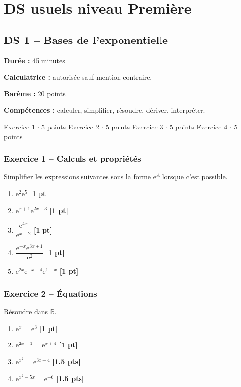 \documentclass[11pt,a4paper]{article}
\newcommand{\R}{\mathbb{R}}
\newcommand{\e}{\mathrm{e}}
\newcommand{\pts}[1]{\hfill \textbf{[#1 pt]}}
\newcommand{\ptss}[1]{\hfill \textbf{[#1 pts]}}
\newcommand{\competences}[1]{\textbf{Compétences :} #1}
\newcommand{\calculatrice}{\textbf{Calculatrice :} autorisée sauf mention contraire.}
\newcommand{\duree}[1]{\textbf{Durée :} #1}
\newcommand{\bareme}[1]{\textbf{Barème :} #1}
\begin{document}
\section{DS usuels niveau Première}

\subsection*{DS 1 -- Bases de l'exponentielle}

\begin{sujetbox}
\duree{45 minutes}

\calculatrice

\bareme{20 points}

\competences{calculer, simplifier, résoudre, dériver, interpréter.}
\end{sujetbox}

\begin{baremebox}
Exercice 1 : 5 points \quad
Exercice 2 : 5 points \quad
Exercice 3 : 5 points \quad
Exercice 4 : 5 points
\end{baremebox}

\subsubsection*{Exercice 1 -- Calculs et propriétés}

Simplifier les expressions suivantes sous la forme $\e^A$ lorsque c'est possible.
\begin{enumerate}
    \item $\e^2\e^5$ \pts{1}
    \item $\e^{x+1}\e^{2x-3}$ \pts{1}
    \item $\dfrac{\e^{4x}}{\e^{x-2}}$ \pts{1}
    \item $\dfrac{\e^{-x}\e^{3x+1}}{\e^2}$ \pts{1}
    \item $\e^{2x}\e^{-x+4}\e^{1-x}$ \pts{1}
\end{enumerate}

\subsubsection*{Exercice 2 -- Équations}

Résoudre dans $\R$.
\begin{enumerate}
    \item $\e^x=\e^3$ \pts{1}
    \item $\e^{2x-1}=\e^{x+4}$ \pts{1}
    \item $\e^{x^2}=\e^{3x+4}$ \ptss{1.5}
    \item $\e^{x^2-5x}=\e^{-6}$ \ptss{1.5}
\end{enumerate}
\end{document}
